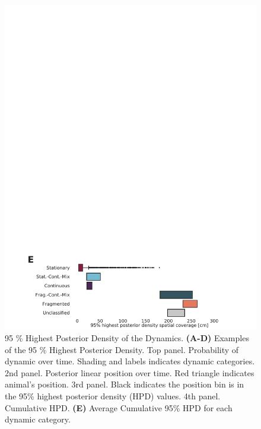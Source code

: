 \documentclass[times, twoside]{zHenriquesLab-StyleBioRxiv}
\begin{document}
\begin{figure}%
\centering
\includegraphics[width=0.80\linewidth]{figures/Figure4/Figure4_v5}
\caption{95 \% Highest Posterior Density of the Dynamics. \textbf{(A-D)}  Examples of the 95 \% Highest Posterior Density. Top panel. Probability of dynamic over time. Shading and labels indicates dynamic categories. 2nd panel. Posterior linear position over time. Red triangle indicates animal's position. 3rd panel. Black indicates the position bin is in the 95\% highest posterior density (HPD) values. 4th panel. Cumulative HPD. \textbf{(E)} Average Cumulative 95\% HPD for each dynamic category.}
\label{4}
\end{figure}
\end{document}
